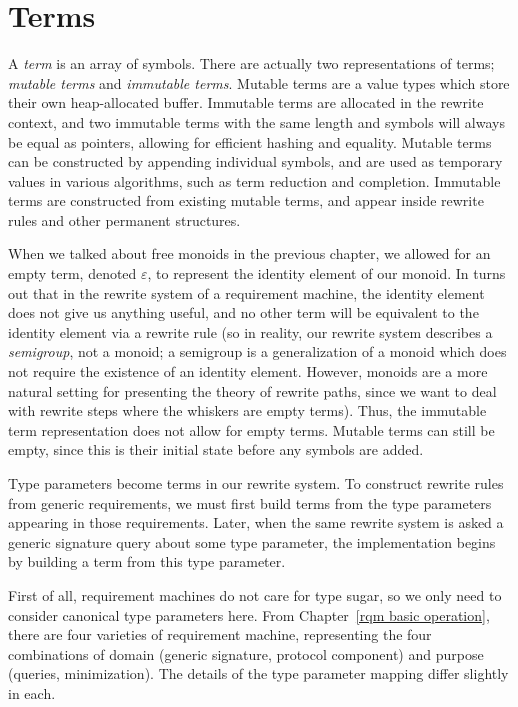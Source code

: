 \documentclass[../generics]{subfiles}
\begin{document}
\section{Terms}\label{building terms}

%
%
%
A \emph{term} is an array of symbols. There are actually two representations of terms; \emph{mutable terms} and \emph{immutable terms}. Mutable terms are a value types which store their own heap-allocated buffer. Immutable terms are allocated in the rewrite context, and two immutable terms with the same length and symbols will always be equal as pointers, allowing for efficient hashing and equality. Mutable terms can be constructed by appending individual symbols, and are used as temporary values in various algorithms, such as term reduction and completion. Immutable terms are constructed from existing mutable terms, and appear inside rewrite rules and other permanent structures.

%
%
%
When we talked about free monoids in the previous chapter, we allowed for an empty term, denoted $\varepsilon$, to represent the identity element of our monoid. In turns out that in the rewrite system of a requirement machine, the identity element does not give us anything useful, and no other term will be equivalent to the identity element via a rewrite rule (so in reality, our rewrite system describes a \emph{semigroup}, not a monoid; a semigroup is a generalization of a monoid which does not require the existence of an identity element. However, monoids are a more natural setting for presenting the theory of rewrite paths, since we want to deal with rewrite steps where the whiskers are empty terms). Thus, the immutable term representation does not allow for empty terms. Mutable terms can still be empty, since this is their initial state before any symbols are added.

%
Type parameters become terms in our rewrite system. To construct rewrite rules from generic requirements, we must first build terms from the type parameters appearing in those requirements. Later, when the same rewrite system is asked a generic signature query about some type parameter, the implementation begins by building a term from this type parameter.

First of all, requirement machines do not care for type sugar, so we only need to consider canonical type parameters here. From Chapter~\ref{rqm basic operation}, there are four varieties of requirement machine, representing the four combinations of domain (generic signature, protocol component) and purpose (queries, minimization). The details of the type parameter mapping differ slightly in each.
\end{document}
